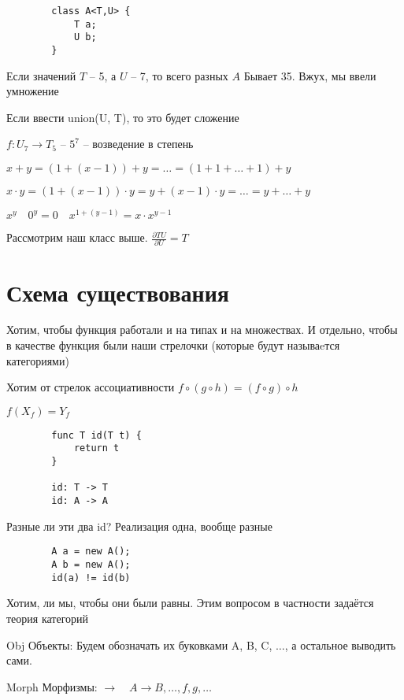 \documentclass{book}
\theoremstyle{definition}
\begin{document}
    \begin{lstlisting}
        class A<T,U> {
            T a;
            U b;
        }
    \end{lstlisting}

    Если значений $T$ -- 5, а  $U$ -- 7, то всего разных  $A$ Бывает 35. Вжух, мы ввели умножение

    Если ввести union(U, T), то это будет сложение

     $f: U_7 \to T_5$ -- $5^7$ -- возведение в степень

     $x+y = (1 + (x-1)) + y = \ldots = \left( 1+1+\ldots+1 \right) +y$

     $x\cdot y = (1+(x-1))\cdot y = y + (x-1)\cdot y = \ldots = y + \ldots + y$

     $x^y\quad 0^y = 0\quad x^{1+(y-1)} = x\cdot x^{y-1}$

    Рассмотрим наш класс выше. $\frac{\partial TU}{\partial U} = T$ 

    \section{Схема существования}

    Хотим, чтобы функция работали и на типах и на множествах. И отдельно, чтобы в качестве функция были наши стрелочки (которые будут называeтся категориями)

    Хотим от стрелок ассоциативности $f\circ (g\circ h) = (f\circ g)\circ h$

    $f\left( X_f \right)  = Y_f$

    \begin{lstlisting}
        func T id(T t) {
            return t
        }

        id: T -> T
        id: A -> A
    \end{lstlisting}

    Разные ли эти два id? Реализация одна, вообще разные

    \begin{lstlisting}
        A a = new A();
        A b = new A();
        id(a) != id(b)
    \end{lstlisting}

    Хотим, ли мы, чтобы они были равны. Этим вопросом в частности задаётся теория категорий


    Obj Объекты: Будем обозначать их буковками A, B, C, $\ldots$, а остальное выводить сами.

    Morph Морфизмы: $\to \quad A\to B, \ldots, f, g, \ldots$
\end{document}
